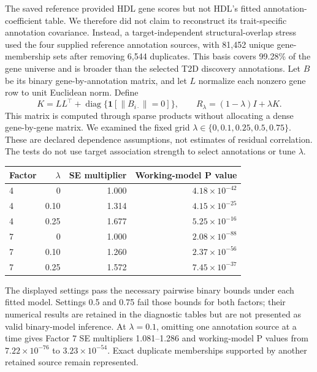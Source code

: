 The saved reference provided HDL gene scores but not HDL's fitted annotation-coefficient table. We therefore did not claim to reconstruct its trait-specific annotation covariance. Instead, a target-independent structural-overlap stress used the four supplied reference annotation sources, with 81,452 unique gene-membership sets after removing 6,544 duplicates. This basis covers 99.28\% of the gene universe and is broader than the selected T2D discovery annotations. Let $B$ be its binary gene-by-annotation matrix, and let $L$ normalize each nonzero gene row to unit Euclidean norm. Define
\begin{equation}
 K=LL^\top+\operatorname{diag}\{\mathbf1[\|B_{i\cdot}\|=0]\},
 \qquad R_\lambda=(1-\lambda)I+\lambda K.
 \label{eq:annotation_overlap_stress}
\end{equation}
This matrix is computed through sparse products without allocating a dense gene-by-gene matrix. We examined the fixed grid $\lambda\in\{0,0.1,0.25,0.5,0.75\}$. These are declared dependence assumptions, not estimates of residual correlation. The tests do not use target association strength to select annotations or tune $\lambda$.

\begin{center}
\begin{tabular}{lrrr}
Factor & $\lambda$ & SE multiplier & Working-model P value\\
\hline
4 & 0 & 1.000 & $4.18\times10^{-42}$\\
4 & 0.10 & 1.314 & $4.15\times10^{-25}$\\
4 & 0.25 & 1.677 & $5.25\times10^{-16}$\\
7 & 0 & 1.000 & $2.08\times10^{-88}$\\
7 & 0.10 & 1.260 & $2.37\times10^{-56}$\\
7 & 0.25 & 1.572 & $7.45\times10^{-37}$\\
\hline
\end{tabular}
\end{center}
The displayed settings pass the necessary pairwise binary bounds under each fitted model. Settings 0.5 and 0.75 fail those bounds for both factors; their numerical results are retained in the diagnostic tables but are not presented as valid binary-model inference. At $\lambda=0.1$, omitting one annotation source at a time gives Factor 7 SE multipliers 1.081--1.286 and working-model P values from $7.22\times10^{-76}$ to $3.23\times10^{-54}$. Exact duplicate memberships supported by another retained source remain represented.


